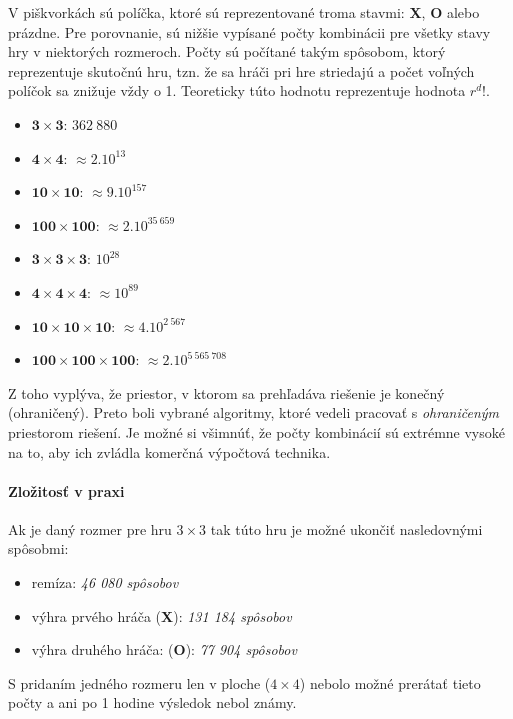 V piškvorkách sú políčka, ktoré sú reprezentované troma stavmi: \textbf{X}, \textbf{O} alebo prázdne.
Pre porovnanie, sú nižšie vypísané počty kombinácii pre všetky stavy hry v niektorých rozmeroch.
Počty sú počítané takým spôsobom, ktorý reprezentuje skutočnú hru, tzn. že sa hráči pri hre striedajú a počet voľných
políčok sa znižuje vždy o 1.
Teoreticky túto hodnotu reprezentuje hodnota $r^d!$.
\begin{itemize}
    \item $\mathbf{3 \times 3}$: $362\ 880$
    \item $\mathbf{4 \times 4}$: $\approx 2.10^{13}$
    \item $\mathbf{10 \times 10}$: $\approx 9.10^{157}$
    \item $\mathbf{100 \times 100}$: $\approx 2.10^{35\ 659}$
    \item $\mathbf{3 \times 3 \times 3}$: $10^{28}$
    \item $\mathbf{4 \times 4 \times 4}$: $\approx 10^{89}$
    \item $\mathbf{10 \times 10 \times 10}$: $\approx 4.10^{2\ 567}$
    \item $\mathbf{100 \times 100 \times 100}$: $\approx 2.10^{5\ 565\ 708}$
\end{itemize}
Z toho vyplýva, že priestor, v ktorom sa prehľadáva riešenie je konečný (ohraničený).
Preto boli vybrané algoritmy, ktoré vedeli pracovať s \emph{ohraničeným} priestorom riešení.
Je možné si všimnúť, že počty kombinácií sú extrémne vysoké na to, aby ich zvládla komerčná výpočtová technika.

\paragraph{Zložitosť v praxi}

Ak je daný rozmer pre hru $3 \times 3$ tak túto hru je možné ukončiť nasledovnými spôsobmi:\cite{number_of_wins}
\begin{itemize}
    \item remíza: \emph{46 080 spôsobov}
    \item výhra prvého hráča (\textbf{X}): \emph{131 184 spôsobov}
    \item výhra druhého hráča: (\textbf{O}): \emph{77 904 spôsobov}
\end{itemize}
S pridaním jedného rozmeru len v ploche ($4 \times 4$) nebolo možné prerátať tieto počty a ani po 1 hodine výsledok
nebol známy.